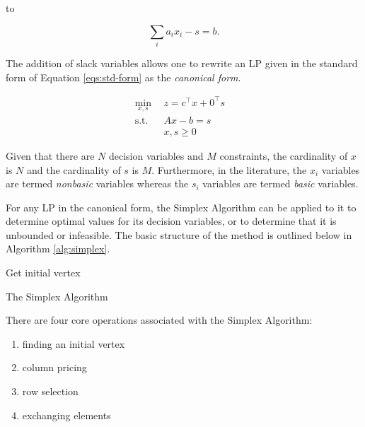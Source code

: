to 

\begin{equation}
  \sum_{i} a_i x_i - s = b.
\end{equation}

The addition of slack variables allows one to rewrite an LP given in the
standard form of Equation \ref{eqs:std-form} as the \textit{canonical form}.

\begin{subequations}\label{eqs:can-form}
  \begin{align}
    \min_{x, s} \:\: & 
    z =  c^{\top} x + 0^{\top} s
    & \label{eqs:can-form_obj} \\
    \text{s.t.} \:\: &
    A x - b = s
    & \label{eqs:can-form_sup} \\
    &
    x, s \geq 0
    &\label{eqs:can-form_x}
  \end{align}
\end{subequations}

Given that there are $N$ decision variables and $M$ constraints, the cardinality
of $x$ is $N$ and the cardinality of $s$ is $M$. Furthermore, in the literature,
the $x_i$ variables are termed \textit{nonbasic} variables whereas the $s_i$
variables are termed \textit{basic} variables.

For any LP in the canonical form, the Simplex Algorithm can be applied to it to
determine optimal values for its decision variables, or to determine that it is
unbounded or infeasible. The basic structure of the method is outlined below in
Algorithm \ref{alg:simplex}.

\begin{algorithm}[h!]
 \SetAlgoLined
 Get initial vertex\;
  \caption{The Simplex Algorithm}\label{alg:simplex}
\end{algorithm}

There are four core operations associated with the Simplex Algorithm:
\begin{enumerate}
  \item finding an initial vertex
  \item column pricing
  \item row selection
  \item exchanging elements
\end{enumerate}


